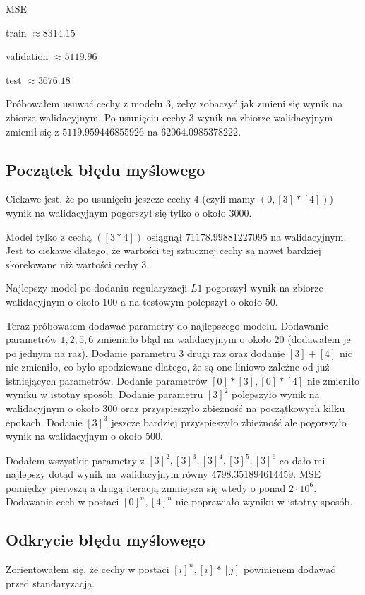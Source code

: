 \documentclass{article}
\begin{document}
  MSE

  train $\approx 8314.15$
  
  validation $\approx 5119.96$
  
  test $\approx 3676.18$

  Próbowałem usuwać cechy z modelu $3$, żeby zobaczyć jak zmieni się wynik na zbiorze walidacyjnym. 
  Po usunięciu cechy $3$ wynik na zbiorze walidacyjnym zmienił się z $5119.959446855926$ na $62064.0985378222$. 

 \subsection{Początek błędu myślowego}

  Ciekawe jest, 
  że po usunięciu jeszcze cechy $4$ (czyli mamy $(0, [3]*[4])$) wynik na walidacyjnym pogorszył się tylko o około $3000$.

  Model tylko z cechą $([3*4])$ osiągnął $71178.99881227095$ na walidacyjnym. Jest to ciekawe dlatego, że wartości tej sztucznej cechy są nawet bardziej skorelowane niż wartości cechy $3$.

  Najlepszy model po dodaniu regularyzacji $L1$ pogorszył wynik na zbiorze walidacyjnym o około $100$ a na testowym polepszył o około $50$.

  Teraz próbowałem dodawać parametry do najlepszego modelu. 
  Dodawanie parametrów $1, 2,5,6$ zmieniało błąd na walidacyjnym o około $20$ (dodawałem je po jednym na raz). 
  Dodanie parametru $3$ drugi raz oraz dodanie $[3]+[4]$ nic nie zmieniło, co było spodziewane dlatego, że są one liniowo zależne od już istniejących parametrów.
  Dodanie parametrów $[0]*[3], [0]*[4]$ nie zmieniło wyniku w istotny sposób.
  Dodanie parametru $[3]^2$ polepszyło wynik na walidacyjnym o około $300$ oraz przyspieszyło zbieżność na początkowych kilku epokach. 
  Dodanie $[3]^3$ jeszcze bardziej przyspieszyło zbieżność ale pogorszyło wynik na walidacyjnym o około $500$. 

  Dodałem wszystkie parametry z $[3]^2, [3]^3, [3]^4, [3]^5, [3]^6$ co dało mi najlepszy dotąd wynik na walidacyjnym równy $4798.351894614459$. MSE pomiędzy pierwszą a drugą iteracją zmniejsza się wtedy o ponad $2\cdot 10^6$.
  Dodawanie cech w postaci $[0]^n, [4]^n$ nie poprawiało wyniku w istotny sposób.
  \subsection{Odkrycie błędu myślowego}
  Zorientowałem się, że cechy w postaci $[i]^n, [i]*[j]$ powinienem dodawać przed standaryzacją.
\end{document}
